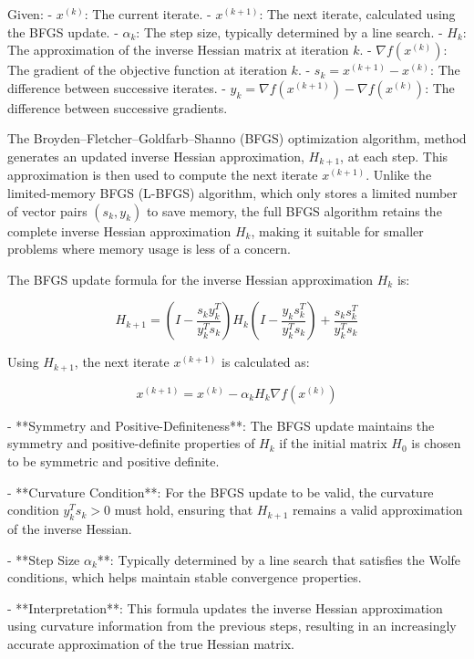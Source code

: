 
Given:
- $x^{(k)}$: The current iterate.
- $x^{(k+1)}$: The next iterate, calculated using the BFGS update.
- $\alpha_k$: The step size, typically determined by a line search.
- $H_k$: The approximation of the inverse Hessian matrix at iteration $k$.
- $\nabla f(x^{(k)})$: The gradient of the objective function at iteration $k$.
- $s_k = x^{(k+1)} - x^{(k)}$: The difference between successive iterates.
- $y_k = \nabla f(x^{(k+1)}) - \nabla f(x^{(k)})$: The difference between successive gradients.

The Broyden–Fletcher–Goldfarb–Shanno (BFGS) optimization algorithm, method generates an updated inverse Hessian approximation, $H_{k+1}$, at each step. This approximation is then used to compute the next iterate $x^{(k+1)}$. Unlike the limited-memory BFGS (L-BFGS) algorithm, which only stores a limited number of vector pairs $(s_k, y_k)$ to save memory, the full BFGS algorithm retains the complete inverse Hessian approximation $H_k$, making it suitable for smaller problems where memory usage is less of a concern.

The BFGS update formula for the inverse Hessian approximation $H_k$ is:

\[
H_{k+1} = \left(I - \frac{s_k y_k^T}{y_k^T s_k}\right) H_k \left(I - \frac{y_k s_k^T}{y_k^T s_k}\right) + \frac{s_k s_k^T}{y_k^T s_k}
\]

Using $H_{k+1}$, the next iterate $x^{(k+1)}$ is calculated as:

\[
x^{(k+1)} = x^{(k)} - \alpha_k H_k \nabla f(x^{(k)})
\]

- **Symmetry and Positive-Definiteness**: The BFGS update maintains the symmetry and positive-definite properties of $H_k$ if the initial matrix $H_0$ is chosen to be symmetric and positive definite.
  
- **Curvature Condition**: For the BFGS update to be valid, the curvature condition $y_k^T s_k > 0$ must hold, ensuring that $H_{k+1}$ remains a valid approximation of the inverse Hessian.
  
- **Step Size $\alpha_k$**: Typically determined by a line search that satisfies the Wolfe conditions, which helps maintain stable convergence properties.

- **Interpretation**: This formula updates the inverse Hessian approximation using curvature information from the previous steps, resulting in an increasingly accurate approximation of the true Hessian matrix.